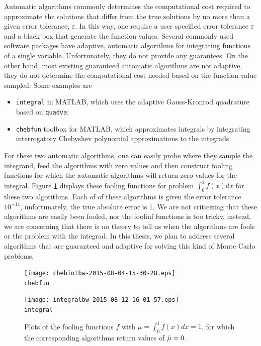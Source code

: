 \documentclass{iitthesis}
\theoremstyle{definition}
\begin{document}

Automatic algorithms commonly determines the computational cost required to approximate the solutions that differ from the true solutions by no more than a given error tolerance, $\varepsilon$. In this way, one require a user specified error tolerance $\varepsilon$ and a black box that generate the function values. Several commonly used software packages have adaptive, automatic algorithms for integrating functions of a single variable. Unfortunately, they do not provide any guarantees. On the other hand, most existing guaranteed automatic algorithms are not adaptive, they do not determine the computational cost needed based on the function value sampled. Some examples are
\begin{itemize}
\item {\tt integral} \cite{Shampone08} in MATLAB, which uses the adaptive Gauss-Kronrod quadrature based on {\tt quadva};
\item {\tt chebfun} toolbox \cite{Chebfun14} for MATLAB, which approximates integrals by integrating interrogatory Chebyshev polynomial approximations to the integrads.
\end{itemize}
For these two automatic algorithms, one can easily probe where they sample the integrand, feed the algorithms with zero values and then construct fooling functions for which the automatic algorithms will return zero values for the integral. Figure \ref{fig:foolingfun} displays these fooling functions for problem $\int_0^1f(x)dx$ for these two algorithms. Each of of these algorithms is given the error tolerance $10^{-14}$, unfortunately, the true absolute error is 1. We are not criticizing that these algorithms are easily been fooled, nor the foolinf functions is too tricky, instead, we are concerning that there is no theory to tell us when the algorithms are fools or the problem with the integrad.
In this thesis, we plan to address several algorithms that are guaranteed and adaptive for solving this kind of Monte Carlo problems.
\begin{figure}[htbp]
\centering
\begin{minipage}{7cm}\centering 
\texttt{[image: chebintbw-2015-08-04-15-30-28.eps]} \\ {\tt chebfun}  \end{minipage}%
\begin{minipage}{7cm}\centering 
\texttt{[image: integralbw-2015-08-12-16-01-57.eps]} \\{\tt integral}
\end{minipage}
\caption{Plots of the fooling functions $f$ with $\mu = \int_0^1f(x)dx=1$, for which the corresponding algorithms return values of $\hat{\mu}=0$.}\label{fig:foolingfun}
 \end{figure}
 
\end{document}

